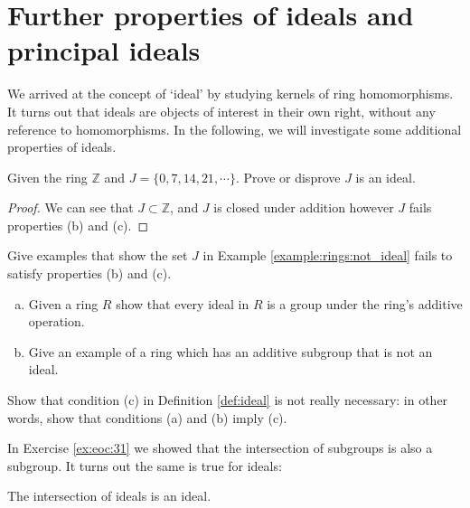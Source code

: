 \section{Further properties of ideals and principal ideals}
\label{sec:FurtherProperties}

We arrived at the concept of `ideal' by studying kernels of ring homomorphisms. It turns out that ideals are objects of interest in their own right, without any reference to homomorphisms. In the following, we will investigate some additional properties of ideals.

\begin{example}\label{example:rings:not_ideal}
Given the ring ${\mathbb Z}$ and $J=\{0,7,14,21,\cdots\}$.  Prove or disprove $J$ is an ideal.
\end{example}

\begin{proof}
We can see that $J\subset {\mathbb Z}$, and $J$ is closed under addition however $J$ fails properties (b) and (c).
\end{proof}

\begin{exercise}
Give examples that show the set $J$ in Example \ref{example:rings:not_ideal} fails to satisfy properties (b) and (c).
\end{exercise}

\begin{exercise}
\begin{enumerate}[(a)]
\item Given a ring $R$ show that every ideal in $R$ is a group under the ring's additive operation.
\item Give an example of a ring which has an additive subgroup that is not an ideal.
\end{enumerate}
\end{exercise}

\begin{exercise}
Show that condition (c) in Definition \ref{def:ideal} is not really necessary:  in other words, show that conditions (a) and (b) imply (c).
\end{exercise}


In Exercise \ref{ex:eoc:31} we showed that the intersection of subgroups is also a subgroup.  It turns out the same is true for ideals:

\begin{prop}\label{proposition:rings:int_ideal} 
The intersection of ideals is an ideal.
\end{prop}


